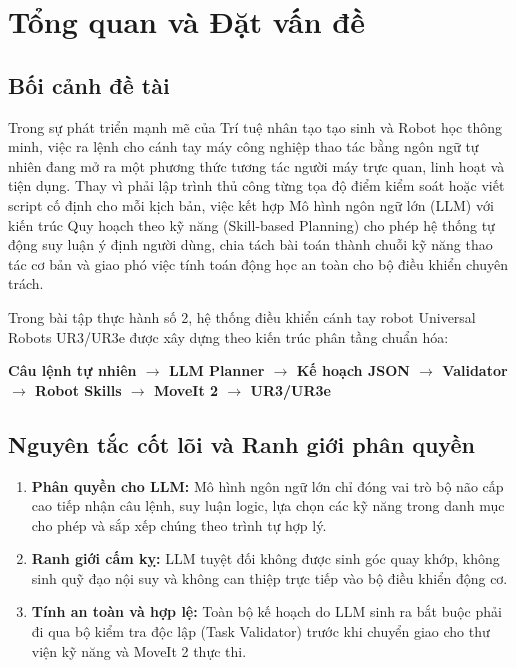 \documentclass[a4paper,12pt]{article}
\begin{document}
\newpage
{}
\tableofcontents
\newpage
\listoffigures
\listoftables
\lstlistoflistings
\newpage
{}

\section{Tổng quan và Đặt vấn đề}

\subsection{Bối cảnh đề tài}
Trong sự phát triển mạnh mẽ của Trí tuệ nhân tạo tạo sinh và Robot học thông minh, việc ra lệnh cho cánh tay máy công nghiệp thao tác bằng ngôn ngữ tự nhiên đang mở ra một phương thức tương tác người máy trực quan, linh hoạt và tiện dụng. Thay vì phải lập trình thủ công từng tọa độ điểm kiểm soát hoặc viết script cố định cho mỗi kịch bản, việc kết hợp Mô hình ngôn ngữ lớn (LLM) với kiến trúc Quy hoạch theo kỹ năng (Skill-based Planning) cho phép hệ thống tự động suy luận ý định người dùng, chia tách bài toán thành chuỗi kỹ năng thao tác cơ bản và giao phó việc tính toán động học an toàn cho bộ điều khiển chuyên trách.

Trong bài tập thực hành số 2, hệ thống điều khiển cánh tay robot Universal Robots UR3/UR3e được xây dựng theo kiến trúc phân tầng chuẩn hóa:
\begin{center}
\textbf{Câu lệnh tự nhiên $\longrightarrow$ LLM Planner $\longrightarrow$ Kế hoạch JSON $\longrightarrow$ Validator $\longrightarrow$ Robot Skills $\longrightarrow$ MoveIt 2 $\longrightarrow$ UR3/UR3e}
\end{center}

\subsection{Nguyên tắc cốt lõi và Ranh giới phân quyền}
\begin{enumerate}
    \item \textbf{Phân quyền cho LLM:} Mô hình ngôn ngữ lớn chỉ đóng vai trò bộ não cấp cao tiếp nhận câu lệnh, suy luận logic, lựa chọn các kỹ năng trong danh mục cho phép và sắp xếp chúng theo trình tự hợp lý.
    \item \textbf{Ranh giới cấm kỵ:} LLM tuyệt đối không được sinh góc quay khớp, không sinh quỹ đạo nội suy và không can thiệp trực tiếp vào bộ điều khiển động cơ.
    \item \textbf{Tính an toàn và hợp lệ:} Toàn bộ kế hoạch do LLM sinh ra bắt buộc phải đi qua bộ kiểm tra độc lập (Task Validator) trước khi chuyển giao cho thư viện kỹ năng và MoveIt 2 thực thi.
\end{enumerate}
\end{document}
